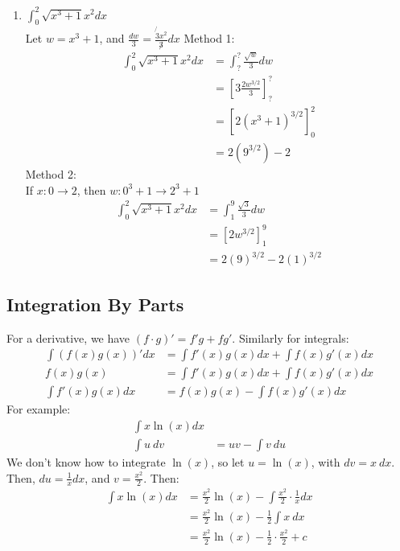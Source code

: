 \documentclass{article}
\begin{document}
\begin{enumerate}
    \item $\int_0^2 \sqrt{x^3 +1} x^2 dx$\\
    Let $w = x^3 + 1$, and $\frac{dw}{3} = \frac{\not{3}x^2}{\not 3} dx$
    Method 1:
    \begin{align*}
        \int_0^2 \sqrt{x^3 +1} x^2 dx & = \int_?^? \frac{\sqrt{w}}{3} dw\\
        & = \left[ 3\frac{2w^{3/2}}{3}\right]_?^?\\
        & = \left[ 2(x^3+1)^{3/2} \right]_0^2\\
        & = 2(9^{3/2}) - 2
    \end{align*}
    Method 2:\\
    If $x: 0 \to 2$, then $w: 0^3 + 1 \to 2^3 + 1$
    \begin{align*}
        \int_0^2 \sqrt{x^3 +1} x^2 dx & = \int_1^9 \frac{\sqrt{3}}{3}dw\\
        & = \left[ 2w^{3/2}\right]_1^9\\
        & = 2(9)^{3/2} - 2(1)^{3/2}
    \end{align*}
\end{enumerate}

\subsection{Integration By Parts}
For a derivative, we have $(f \cdot g)' = f'g + fg'$. Similarly for integrals:
\begin{align*}
    \int (f(x)g(x))' dx & = \int f'(x)g(x) dx + \int f(x)g'(x) dx\\
    f(x)g(x) & = \int f'(x)g(x) dx + \int f(x)g'(x) dx\\
    \int f'(x)g(x) dx & = f(x)g(x) - \int f(x)g'(x) dx
\end{align*}
For example:
\begin{align*}
    \int x \ln(x) dx\\
    \int u \ dv &  = uv - \int v \ du
\end{align*}
We don't know how to integrate $\ln(x)$, so let $u = \ln(x)$, with $dv = x \ dx$. Then, $du = \frac{1}{x} dx$, and $v = \frac{x^2}{2}$. Then:
\begin{align*}
    \int x \ln(x) dx & = \frac{x^2}{2}\ln(x) - \int \frac{x^2}{2} \cdot \frac{1}{x} dx\\
    & = \frac{x^2}{2} \ln(x) - \frac{1}{2} \int x \ dx\\
    & = \frac{x^2}{2} \ln(x) - \frac{1}{2} \cdot \frac{x^2}{2} + c
\end{align*}
\end{document}
